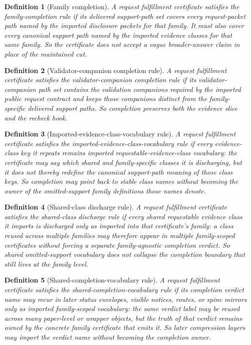 \documentclass[11pt]{article}
\newtheorem{definition}{Definition}
\begin{document}
\begin{definition}[Family completion]
A request fulfillment certificate satisfies the \emph{family-completion rule} if its delivered support-path set covers every request-packet path named by the imported disclosure packets for that family.
It must also cover every canonical support path named by the imported evidence classes for that same family.
So the certificate does not accept a vague broader-answer claim in place of the maintained cut.
\end{definition}

\begin{definition}[Validator-companion completion rule]
A request fulfillment certificate satisfies the \emph{validator-companion completion rule} if its validator-companion path set contains the validation companions required by the imported public request contract and keeps those companions distinct from the family-specific delivered support paths.
So completion preserves both the evidence slice and the recheck hook.
\end{definition}

\begin{definition}[Imported-evidence-class-vocabulary rule]
A request fulfillment certificate satisfies the \emph{imported-evidence-class-vocabulary rule} if every evidence-class key it repeats remains imported requestable-evidence-class vocabulary: the certificate may say which shared and family-specific classes it is discharging, but it does not thereby redefine the canonical support-path meaning of those class keys.
So completion may point back to stable class names without becoming the owner of the omitted-support family definitions those names denote.
\end{definition}
\begin{definition}[Shared-class discharge rule]
A request fulfillment certificate satisfies the \emph{shared-class discharge rule} if every shared requestable evidence class it imports is discharged only \emph{as imported into that certificate's family}: a class reused across multiple families may therefore appear in multiple family-scoped certificates without forcing a separate family-agnostic completion verdict.
So shared omitted-support vocabulary does not collapse the completion boundary that still lives at the family level.
\end{definition}

\begin{definition}[Shared-completion-vocabulary rule]
A request fulfillment certificate satisfies the \emph{shared-completion-vocabulary rule} if its completion verdict name may recur in later status envelopes, visible notices, routes, or spine mirrors only as imported family-scoped vocabulary: the same verdict label may be reused across many paper-level or wrapper objects, but the truth of that verdict remains owned by the concrete family certificate that emits it.
So later compression layers may import the verdict name without becoming the completion owner.
\end{definition}
\end{document}
